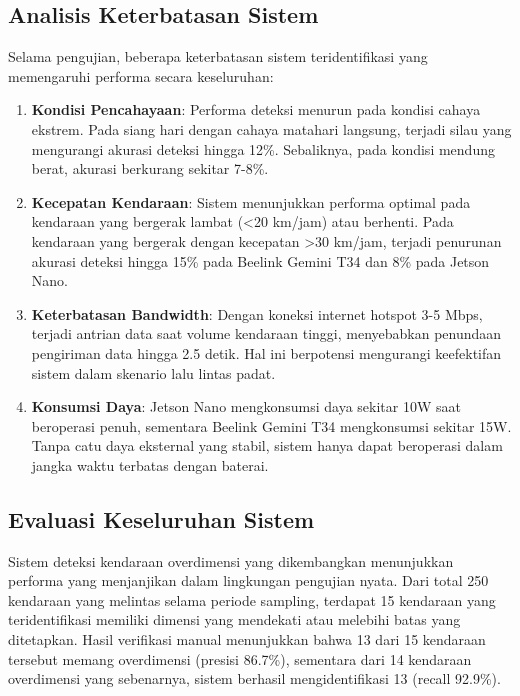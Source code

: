 \subsection{Analisis Keterbatasan Sistem}

Selama pengujian, beberapa keterbatasan sistem teridentifikasi yang memengaruhi performa secara keseluruhan:

\begin{enumerate}
    \item \textbf{Kondisi Pencahayaan}: Performa deteksi menurun pada kondisi cahaya ekstrem. Pada siang hari dengan cahaya matahari langsung, terjadi silau yang mengurangi akurasi deteksi hingga 12\%. Sebaliknya, pada kondisi mendung berat, akurasi berkurang sekitar 7-8\%.
    
    \item \textbf{Kecepatan Kendaraan}: Sistem menunjukkan performa optimal pada kendaraan yang bergerak lambat (<20 km/jam) atau berhenti. Pada kendaraan yang bergerak dengan kecepatan >30 km/jam, terjadi penurunan akurasi deteksi hingga 15\% pada Beelink Gemini T34 dan 8\% pada Jetson Nano.
    
    \item \textbf{Keterbatasan Bandwidth}: Dengan koneksi internet hotspot 3-5 Mbps, terjadi antrian data saat volume kendaraan tinggi, menyebabkan penundaan pengiriman data hingga 2.5 detik. Hal ini berpotensi mengurangi keefektifan sistem dalam skenario lalu lintas padat.
    
    \item \textbf{Konsumsi Daya}: Jetson Nano mengkonsumsi daya sekitar 10W saat beroperasi penuh, sementara Beelink Gemini T34 mengkonsumsi sekitar 15W. Tanpa catu daya eksternal yang stabil, sistem hanya dapat beroperasi dalam jangka waktu terbatas dengan baterai.
\end{enumerate}

\subsection{Evaluasi Keseluruhan Sistem}

Sistem deteksi kendaraan overdimensi yang dikembangkan menunjukkan performa yang menjanjikan dalam lingkungan pengujian nyata. Dari total 250 kendaraan yang melintas selama periode sampling, terdapat 15 kendaraan yang teridentifikasi memiliki dimensi yang mendekati atau melebihi batas yang ditetapkan. Hasil verifikasi manual menunjukkan bahwa 13 dari 15 kendaraan tersebut memang overdimensi (presisi 86.7\%), sementara dari 14 kendaraan overdimensi yang sebenarnya, sistem berhasil mengidentifikasi 13 (recall 92.9\%).

